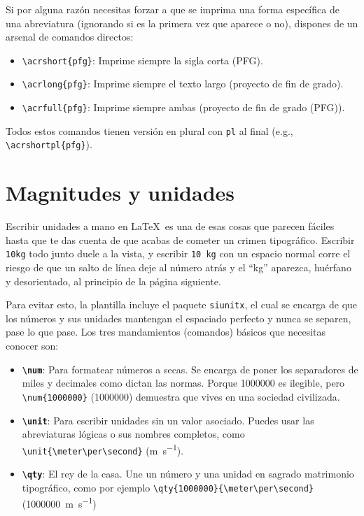 Si por alguna razón necesitas forzar a que se imprima una forma específica de una abreviatura (ignorando si es la primera vez que aparece o no), dispones de un arsenal de comandos directos:

\begin{itemize}
    \item \texttt{\textbackslash acrshort\{pfg\}}: Imprime siempre la sigla corta (PFG).
    \item \texttt{\textbackslash acrlong\{pfg\}}: Imprime siempre el texto largo (proyecto de fin de grado).
    \item \texttt{\textbackslash acrfull\{pfg\}}: Imprime siempre ambas (proyecto de fin de grado (PFG)).
\end{itemize}

Todos estos comandos tienen versión en plural con \texttt{pl} al final (e.g., \texttt{\textbackslash acrshortpl\{pfg\}}).

\section{Magnitudes y unidades}
\label{sec:siunitx}

Escribir unidades a mano en \LaTeX\ es una de esas cosas que parecen fáciles hasta que te das cuenta de que acabas de cometer un crimen tipográfico. Escribir \texttt{10kg} todo junto duele a la vista, y escribir \texttt{10 kg} con un espacio normal corre el riesgo de que un salto de línea deje al número atrás y el \enquote{kg} aparezca, huérfano y desorientado, al principio de la página siguiente.

Para evitar esto, la plantilla incluye el paquete \texttt{siunitx}, el cual se encarga de que los números y sus unidades mantengan el espaciado perfecto y nunca se separen, pase lo que pase. Los tres mandamientos (comandos) básicos que necesitas conocer son:

\begin{itemize}
    \item \textbf{\texttt{\textbackslash num}}: Para formatear números a secas. Se encarga de poner los separadores de miles y decimales como dictan las normas. Porque 1000000 es ilegible, pero \lstinline|\num{1000000}| (\num{1000000}) demuestra que vives en una sociedad civilizada.
    \item \textbf{\texttt{\textbackslash unit}}: Para escribir unidades sin un valor asociado. Puedes usar las abreviaturas lógicas o sus nombres completos, como \lstinline|\unit{\meter\per\second}| (\unit{\meter\per\second}).
    \item \textbf{\texttt{\textbackslash qty}}: El rey de la casa. Une un número y una unidad en sagrado matrimonio tipográfico, como por ejemplo \lstinline|\qty{1000000}{\meter\per\second}| (\qty{1000000}{\meter\per\second})
\end{itemize}


